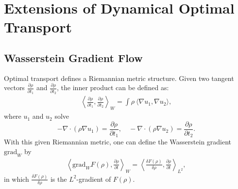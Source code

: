 \documentclass[11pt]{book}
\begin{document}
\chapter[Ext. Dynamical OT]{Extensions of Dynamical Optimal Transport}









\section{Wasserstein Gradient Flow}

Optimal transport defines a Riemannian metric structure. Given two tangent vectors $\frac{\partial\rho}{\partial t_1}$ and $\frac{\partial\rho}{\partial t_2}$, the inner product can be defined as:
\begin{align}\label{eqn:Wmetric}
\left\langle \frac{\partial\rho}{\partial t_1}, \frac{\partial\rho}{\partial t_2} \right\rangle_W = \int \rho\ \langle \nabla u_1, \nabla u_2 \rangle,
\end{align}
where $u_1$ and $u_2$ solve
\[
-\nabla\cdot(\rho\nabla u_1) = \frac{\partial\rho}{\partial t_1}, \quad 
-\nabla\cdot(\rho\nabla u_2) = \frac{\partial\rho}{\partial t_2}.
\]
With this given Riemannian metric, one can define the Wasserstein gradient $\text{grad}_W$ by 
\begin{align}\label{eqn:Wgrad}
\left\langle \text{grad}_W F(\rho), \frac{\partial\rho}{\partial t} \right\rangle_W = 
\left\langle \frac{\delta F(\rho)}{\delta \rho}, \frac{\partial\rho}{\partial t} \right\rangle_{L^2},
\end{align}
in which $ \frac{\delta F(\rho)}{\delta \rho}$ is the $L^2$-gradient of $F(\rho)$.
\end{document}
